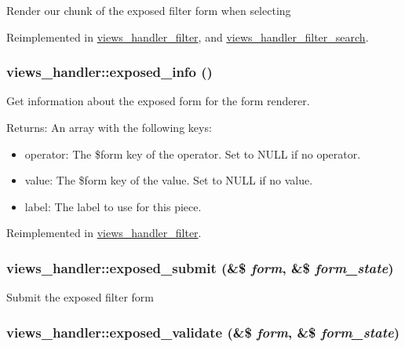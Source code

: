 Render our chunk of the exposed filter form when selecting 

Reimplemented in \hyperlink{classviews__handler__filter_f97b055d96353032bebd186c66bbb5eb}{views\_\-handler\_\-filter}, and \hyperlink{classviews__handler__filter__search_fc00db448aa56fcd91e9ab0dbbe7d1ac}{views\_\-handler\_\-filter\_\-search}.\hypertarget{classviews__handler_2f16176116ecd86a8f8c60a2bc1ebd54}{
\subsubsection[{exposed\_\-info}]{\setlength{\rightskip}{0pt plus 5cm}views\_\-handler::exposed\_\-info ()}}
\label{classviews__handler_2f16176116ecd86a8f8c60a2bc1ebd54}


Get information about the exposed form for the form renderer.

\begin{Desc}
\item[Returns:]An array with the following keys:\begin{itemize}
\item operator: The \$form key of the operator. Set to NULL if no operator.\item value: The \$form key of the value. Set to NULL if no value.\item label: The label to use for this piece. \end{itemize}
\end{Desc}


Reimplemented in \hyperlink{classviews__handler__filter_5405764212dfafae60fa032c217461b4}{views\_\-handler\_\-filter}.\hypertarget{classviews__handler_6b0a97cfe77b3f9dfcfad08f21f5c0f7}{
\subsubsection[{exposed\_\-submit}]{\setlength{\rightskip}{0pt plus 5cm}views\_\-handler::exposed\_\-submit (\&\$ {\em form}, \/  \&\$ {\em form\_\-state})}}
\label{classviews__handler_6b0a97cfe77b3f9dfcfad08f21f5c0f7}


Submit the exposed filter form \hypertarget{classviews__handler_2dd536754e4764cc82ffe7c864f54b16}{
\subsubsection[{exposed\_\-validate}]{\setlength{\rightskip}{0pt plus 5cm}views\_\-handler::exposed\_\-validate (\&\$ {\em form}, \/  \&\$ {\em form\_\-state})}}
\label{classviews__handler_2dd536754e4764cc82ffe7c864f54b16}


